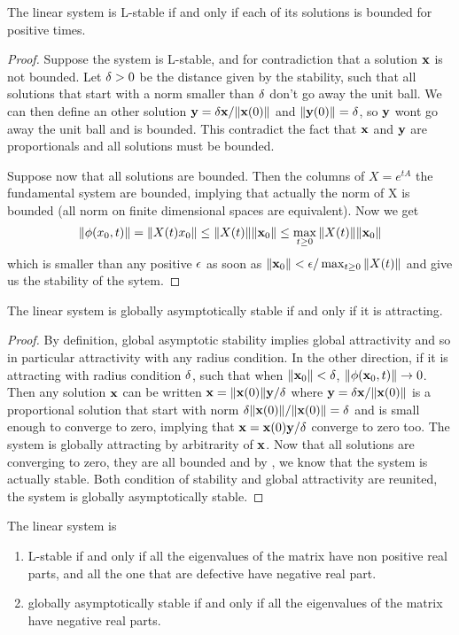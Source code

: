  \begin{theoreme} \label{th:stablecondition}
     The linear system is L-stable if and only if each of its solutions is bounded for positive times.
 \end{theoreme}
 \begin{proof}
  Suppose the system is L-stable, and for contradiction that a solution $\mathbf{x}$ is not bounded. Let $\delta>0$ be the distance given by the stability, such that all solutions that start with a norm smaller than $\delta$ don't go away the unit ball. We can then define an other solution $\mathbf{y}=\delta\mathbf{x}/\|\mathbf{x}(0)\|$ and $\|\mathbf{y}(0)\|=\delta$, so $\mathbf{y}$ wont go away the unit ball and is bounded. This contradict the fact that $\mathbf{x}$ and $\mathbf{y}$ are proportionals and all solutions must be bounded.
  
  Suppose now that all solutions are bounded. Then the columns of $X=e^{tA}$ the fundamental system are bounded, implying that actually the norm of X is bounded (all norm on finite dimensional spaces are equivalent). Now we get 
  \[ \|\phi(x_0,t)\|=\|X(t)x_0\| 
  \leq \|X(t)\| \|\mathbf{x}_0\| 
  \leq \max_{t\geq0} \|X(t)\| \|\mathbf{x}_0\| \]
  which is smaller than any positive $\epsilon$ as soon as $\|\mathbf{x}_0\|<\epsilon/\max_{t\geq0} \|X(t)\|$ and give us the stability of the sytem.
 \end{proof}
\begin{theoreme}
    The linear system is globally asymptotically stable if and only if it is attracting.
\end{theoreme}
\begin{proof}
By definition, global asymptotic stability implies global attractivity and so in particular attractivity with any radius condition. In the other direction, if it is attracting with radius condition $\delta$, such that when $\|\mathbf{x}_0\|<\delta$, $\|\phi(\mathbf{x}_0,t)\|\to0$. Then any solution $\mathbf{x}$ can be written $\mathbf{x}=\|\mathbf{x}(0)\|\mathbf{y}/\delta$ where $\mathbf{y}=\delta\mathbf{x}/\|\mathbf{x}(0)\|$ is a proportional solution that start with norm $\delta\|\mathbf{x}(0)\|/\|\mathbf{x}(0)\|=\delta$ and is small enough to converge to zero, implying that $\mathbf{x}=\mathbf{x}(0)\mathbf{y}/\delta$ converge to zero too. The system is globally attracting by arbitrarity of $\mathbf{x}$. Now that all solutions are converging to zero, they are all bounded and by , we know that the system is actually stable. Both condition of stability and global attractivity are reunited, the system is globally asymptotically stable.
\end{proof}
\begin{theoreme}
    The linear system is 
    \begin{enumerate}
     \item L-stable if and only if all the eigenvalues of the matrix have non positive real parts, and all the one that are defective have negative real part.
    \item globally asymptotically stable if and only if all the eigenvalues of the matrix
    have negative real parts.
    \end{enumerate}
\end{theoreme}

